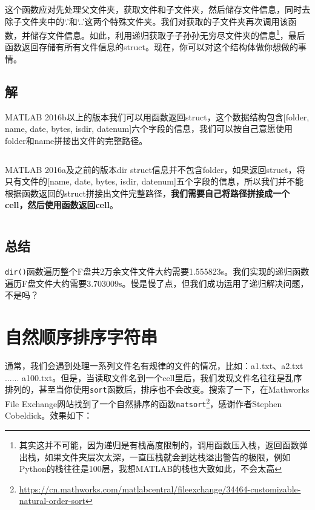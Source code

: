这个函数应对先处理父文件夹，获取文件和子文件夹，然后储存文件信息，同时去除子文件夹中的`.'和`..'这两个特殊文件夹。我们对获取的子文件夹再次调用该函数，并储存文件信息。如此，利用递归获取子子孙孙无穷尽文件夹的信息\footnote{其实这并不可能，因为递归是有栈高度限制的，调用函数压入栈，返回函数弹出栈，如果文件夹层次太深，一直压栈就会到达栈溢出警告的极限，例如Python的栈往往是100层，我想MATLAB的栈也大致如此，不会太高}，最后函数返回存储有所有文件信息的struct。现在，你可以对这个结构体做你想做的事情。

\subsection*{解}

MATLAB 2016b以上的版本我们可以用函数返回struct，这个数据结构包含[folder, name, date, bytes, isdir, datenum]六个字段的信息，我们可以按自己意愿使用folder和name拼接出文件的完整路径。

\inputminted[firstline=1]{Matlab}{code/matlab/get_all_file_name_R2016b_newer.m}

MATLAB 2016a及之前的版本dir struct信息并不包含folder，如果返回struct，将只有文件的[name, date, bytes, isdir, datenum]五个字段的信息，所以我们并不能根据函数返回的struct拼接出文件完整路径，\textbf{我们需要自己将路径拼接成一个cell，然后使用函数返回cell}。

\inputminted{Matlab}{code/matlab/get_all_file_name_R2016a_older.m}

\subsection*{总结}
\texttt{dir()}函数遍历整个F盘共2万余文件文件大约需要1.555823s。我们实现的递归函数遍历F盘文件大约需要3.703009s。慢是慢了点，但我们成功运用了递归解决问题，不是吗？

\section{自然顺序排序字符串}

通常，我们会遇到处理一系列文件名有规律的文件的情况，比如：a1.txt、a2.txt ...... a100.txt。但是，当读取文件名到一个cell里后，我们发现文件名往往是乱序排列的，甚至当你使用\texttt{sort}函数后，排序也不会改变。搜索了一下，在Mathworks File Exchange网站找到了一个自然排序的函数\texttt{natsort}\footnote{\url{https://cn.mathworks.com/matlabcentral/fileexchange/34464-customizable-natural-order-sort}}，感谢作者Stephen Cobeldick。效果如下：

